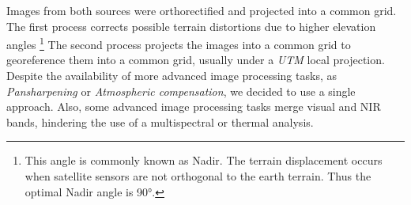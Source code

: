 Images from both sources were orthorectified and projected into a common grid. The first process corrects possible terrain distortions due to higher elevation angles \footnote{This angle is commonly known as Nadir. The terrain displacement occurs when satellite sensors are not orthogonal to the earth terrain. Thus the optimal Nadir angle is \ang{90}.} The second process projects the images into a common grid to georeference them into a common grid, usually under a \textit{UTM} local projection. Despite the availability of more advanced image processing tasks, as \textit{Pansharpening} or \textit{Atmospheric compensation}, we decided to use a single approach. Also, some advanced image processing tasks merge visual and NIR bands, hindering the use of a multispectral or thermal analysis. 


